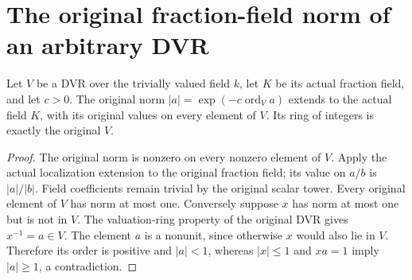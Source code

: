 \section{The original fraction-field norm of an arbitrary DVR}

\begin{theorem}
\label{thm:actual-dvr-fraction-point}
\leanok
Let $V$ be a DVR over the trivially valued field $k$, let $K$ be its actual
fraction field, and let $c>0$. The original norm
$|a|=\exp(-c\operatorname{ord}_V a)$ extends to the actual field $K$,
with its original values on every element of $V$. Its ring of integers is
exactly the original $V$.
\end{theorem}
\begin{proof}
The original norm is nonzero on every nonzero element of $V$. Apply the
actual localization extension to the original fraction field; its value on
$a/b$ is $|a|/|b|$. Field coefficients remain trivial by the original scalar
tower. Every original element of $V$ has norm at most one. Conversely suppose
$x$ has norm at most one but is not in $V$. The valuation-ring property of
the original DVR gives $x^{-1}=a\in V$. The element $a$ is a nonunit, since
otherwise $x$ would also lie in $V$. Therefore its order is positive and
$|a|<1$, whereas $|x|\le1$ and $xa=1$ imply $|a|\ge1$, a contradiction.
\end{proof}
